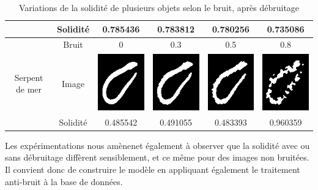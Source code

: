 \documentclass{article}
\theoremstyle{definition}
\begin{document}
\begin{table}[!h]
\begin{tabular}{|c|c|c|c|c|c|}
	    \cline{2-6}
	    & Solidité & 0.785436 & 0.783812 & 0.780256 & 0.735086 \\
	    \hline
	    \hline
	    & Bruit & 0 & 0.3 & 0.5 & 0.8 \\
	    \cline{2-6}
	    Serpent de mer & Image & \includegraphics[scale=0.3]{Illustrations/sea_snake-20-debruite.png} & \includegraphics[scale=0.3]{Illustrations/sea_snake-20-debruite(3).png} & \includegraphics[scale=0.3]{Illustrations/sea_snake-20-debruite(5).png} & \includegraphics[scale=0.3]{Illustrations/sea_snake-20-debruite(8).png} \\
	    \cline{2-6}
	    & Solidité & 0.485542 & 0.491055 & 0.483393 & 0.960359 \\
	    \hline	    
	  \end{tabular}
	  \caption{Variations de la solidité de plusieurs objets selon le bruit, après débruitage}
	  \label{solidité-noise-debruite-table}
	  \end{table}
	  
	  Les expérimentations nous amènenet également à observer que la solidité avec ou sans débruitage diffèrent sensiblement, et ce même pour des images non bruitées. Il convient donc de construire le modèle en appliquant également le traitement anti-bruit à la base de données.
\end{document}
